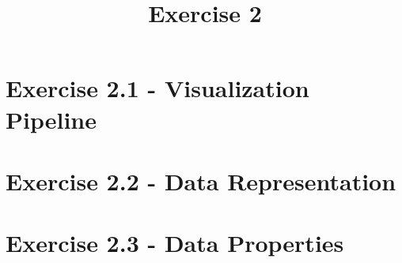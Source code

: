 \documentclass[a4paper]{article}
\date{}
\author{}
\title{Exercise 2}
\begin{document}
	
	\maketitle 
	\thispagestyle{fancy}
	
	\section*{Exercise 2.1 - Visualization Pipeline}
	
	\section*{Exercise 2.2 - Data Representation}
	
	\section*{Exercise 2.3 - Data Properties}
\end{document}
